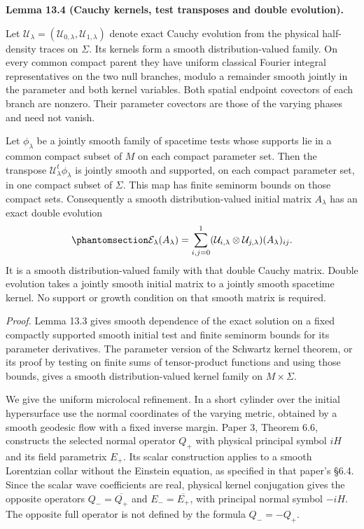 \documentclass[
  english,
  11pt,
  reqno]{amsart}
\makeatletter
\newcommand{\pandocstatementheading}[1]{%
  \par\addpenalty{\@beginparpenalty}%
  \addvspace{.5\baselineskip plus .2\baselineskip minus .2\baselineskip}%
  {\normalfont\bfseries #1\par}%
  \nobreak\@afterindenttrue\@afterheading
}
\makeatother
\begin{document}
\pandocstatementheading{\protect{}\label{lem:family-cauchy-kernels}Lemma 13.4 (Cauchy kernels, test transposes and double evolution).}

Let
\(\mathcal U_\lambda=(\mathcal U_{0,\lambda},\mathcal U_{1,\lambda})\)
denote exact Cauchy evolution from the physical half-density traces on
\(\Sigma\). Its kernels form a smooth distribution-valued family. On
every common compact parent they have uniform classical Fourier integral
representatives on the two null branches, modulo a remainder smooth
jointly in the parameter and both kernel variables. Both spatial
endpoint covectors of each branch are nonzero. Their parameter covectors
are those of the varying phases and need not vanish.

Let \(\phi_\lambda\) be a jointly smooth family of spacetime tests whose
supports lie in a common compact subset of \(M\) on each compact
parameter set. Then the transpose \(\mathcal U_\lambda^t\phi_\lambda\)
is jointly smooth and supported, on each compact parameter set, in one
compact subset of \(\Sigma\). This map has finite seminorm bounds on
those compact sets. Consequently a smooth distribution-valued initial
matrix \(A_\lambda\) has an exact double evolution
\begin{equation}\protect\phantomsection\label{eq:family-double-cauchy-evolution}{
\mathcal E_\lambda(A_\lambda)
=\sum_{i,j=0}^1
 (\mathcal U_{i,\lambda}\otimes\mathcal U_{j,\lambda})
 (A_\lambda)_{ij}.
}\end{equation} It is a smooth distribution-valued family with that
double Cauchy matrix. Double evolution takes a jointly smooth initial
matrix to a jointly smooth spacetime kernel. No support or growth
condition on that smooth matrix is required.

\emph{Proof.} Lemma 13.3 gives smooth dependence of the exact solution
on a fixed compactly supported smooth initial test and finite seminorm
bounds for its parameter derivatives. The parameter version of the
Schwartz kernel theorem, or its proof by testing on finite sums of
tensor-product functions and using those bounds, gives a smooth
distribution-valued kernel family on \(M\times\Sigma\).

We give the uniform microlocal refinement. In a short cylinder over the
initial hypersurface use the normal coordinates of the varying metric,
obtained by a smooth geodesic flow with a fixed inverse margin. Paper 3,
Theorem 6.6, constructs the selected normal operator \(Q_+\) with
physical principal symbol \(iH\) and its field parametrix \(E_+\). Its
scalar construction applies to a smooth Lorentzian collar without the
Einstein equation, as specified in that paper's §6.4. Since the scalar
wave coefficients are real, physical kernel conjugation gives the
opposite operators \(Q_-=\overline{Q_+}\) and \(E_-=\overline{E_+}\),
with principal normal symbol \(-iH\). The opposite full operator is not
defined by the formula \(Q_-=-Q_+\).
\end{document}
